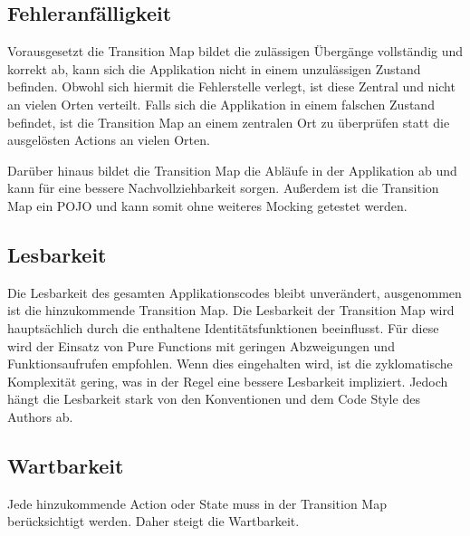 \subsection{Fehleranfälligkeit}
Vorausgesetzt die Transition Map bildet die zulässigen Übergänge vollständig und korrekt ab, kann sich die Applikation nicht in einem unzulässigen Zustand befinden. Obwohl sich hiermit die Fehlerstelle verlegt, ist diese Zentral und nicht an vielen Orten verteilt. Falls sich die Applikation in einem falschen Zustand befindet, ist die Transition Map an einem zentralen Ort zu überprüfen statt die ausgelösten Actions an vielen Orten.

Darüber hinaus bildet die Transition Map die Abläufe in der Applikation ab und kann für eine bessere Nachvollziehbarkeit sorgen. Außerdem ist die Transition Map ein POJO und kann somit ohne weiteres Mocking getestet werden.

\subsection{Lesbarkeit}
Die Lesbarkeit des gesamten Applikationscodes bleibt unverändert, ausgenommen ist die hinzukommende Transition Map. Die Lesbarkeit der Transition Map wird hauptsächlich durch die enthaltene Identitätsfunktionen beeinflusst. Für diese wird der Einsatz von Pure Functions mit geringen Abzweigungen und Funktionsaufrufen empfohlen. Wenn dies eingehalten wird, ist die zyklomatische Komplexität gering, was in der Regel eine bessere Lesbarkeit impliziert. Jedoch hängt die Lesbarkeit stark von den Konventionen und dem Code Style des Authors ab.

\subsection{Wartbarkeit}
Jede hinzukommende Action oder State muss in der Transition Map berücksichtigt werden. Daher steigt die Wartbarkeit.


